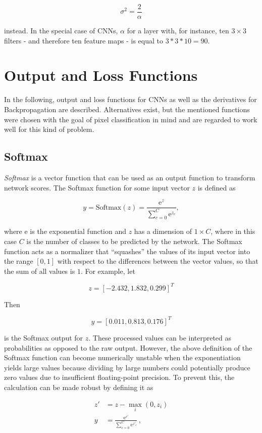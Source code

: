 \[ \sigma^2 = \frac{2}{\alpha} \]

\noindent instead. In the special case of CNNs, $\alpha$ for a layer with, for instance, ten $3 \times 3$ filters - and therefore ten feature maps -  is equal to $3 * 3 * 10 = 90$. \cite{unet}\\


	\section {Output and Loss Functions}
In the following, output and loss functions for CNNs as well as the derivatives for Backpropagation are described. Alternatives exist, but the mentioned functions were chosen with the goal of pixel classification in mind and are regarded to work well for this kind of problem.


	\subsection{Softmax}
\label{subsec:softmax}

\textit{Softmax} is a vector function that can be used as an output function to transform network scores. The Softmax function for some input vector $z$ is defined as

\[y = \text{Softmax}(z) = \frac{\text{e}^{z}}{\sum_{c=0}^{C} \text{e}^{z_c}},\]

\noindent where e is the exponential function and $z$ has a dimension of $1 \times C$, where in this case $C$ is the number of classes to be predicted by the network. The Softmax function acts as a normalizer that ``squashes'' the values of its input vector into the range $[0, 1]$ with respect to the differences between the vector values, so that the sum of all values is $1$. For example, let 

\[ z = [-2.432, 1.832, 0.299]^T \]

\noindent Then 

\[ y = [0.011, 0.813, 0.176]^T \]

\noindent is the Softmax output for $z$. These processed values can be interpreted as probabilities as opposed to the raw output. However, the above definition of the Softmax function can become numerically unstable when the exponentiation yields large values because dividing by large numbers could potentially produce zero values due to insufficient floating-point precision. To prevent this, the calculation can be made robust by defining it as

\begin {align}
	z' &= z - \max \limits_{i}(0, z_i)\\
	y &= \frac{\text{e}^{c'}}{\sum_{c=0}^{C} \text{e}^{z'_{{c}}}} \,,
\end {align}

